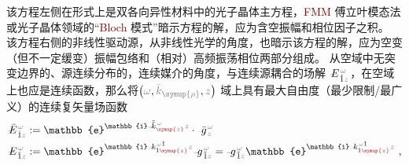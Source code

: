 {\one} 该方程左侧在形式上是双各向异性材料\cite{berryOpticalSingularitiesBianisotropic2005,changWavePropagationBianisotropic2014}中的光子晶体主方程\cite{sakodaOpticalPropertiesPhotonic2005,joannopoulosPhotonicCrystalsMolding2008}，\textcolor{Maroon}{FMM} 傅立叶模态法或光子晶体领域的“\textcolor{Maroon}{Bloch} 模式”暗示方程的解，应为含空振幅和相位因子之积。{\two} 该方程右侧的非线性驱动源，从非线性光学的角度，也暗示该方程的解，应为空变（但不一定缓变）振幅包络和（相对）高频振荡相位两部分组成\cite{boydNonlinearOptics2019}。{\three} 从空域中无突变边界的、源连续分布的，连续媒介的角度，与连续源耦合的场解 $\Xint{\mathcolor{gray}{-}}{25}{E}^{\;\!\mathcolor{gray}{\omega}}_{\;\! \hat{1} \mathcolor{gray}{z}}$，在空域上也应是连续函数，那么将$\left( \mathcolor{gray}{\omega}, \mathcolor{gray}{\bar{k}_{\symup{\rho}}}, \mathcolor{gray}{z} \right)$ 域上具有最大自由度（最少限制/最广义）的连续复矢量场函数
\begin{subequations} \label{eq:trial_solution}
\begin{align}
	\Xint{\mathcolor{gray}{-}}{30}{\bar{E}}^{\;\!\mathcolor{gray}{\omega}}_{\;\! \hat{1} \mathcolor{gray}{z}} &:= \mathbb{e}^{\mathbb{i} \Xint{{}^{}_{\mathcolor{gray}{-}}}{10}{\bar{\bar{k}}}_{\textcolor{Maroon}{\symup{z}}}^{\;\! \mathcolor{gray}{\omega}} \mathcolor{gray}{z}} \cdot \Xint{{}^{}_{\mathcolor{gray}{-}}}{10}{\bar{g}}^{\;\!\mathcolor{gray}{\omega}}_{\;\! \mathcolor{gray}{z}} \label{eq:vec-trial_solution} \\
	\Xint{\mathcolor{gray}{-}}{30}{E}^{\;\!\mathcolor{gray}{\omega}}_{\;\! \hat{1} \mathcolor{gray}{z}} &:= \mathbb{e}^{\mathbb{i} \Xint{{}^{}_{\mathcolor{gray}{-}}}{10}{k}_{\hat{1} \textcolor{Maroon}{\symup{z}}}^{\;\! \mathcolor{gray}{\omega} \tilde{1}} \mathcolor{gray}{z}} \Xint{{}^{}_{\mathcolor{gray}{-}}}{10}{g}^{\;\!\mathcolor{gray}{\omega}}_{\;\! \tilde{1} \mathcolor{gray}{z}} = \Xint{{}^{}_{\mathcolor{gray}{-}}}{10}{g}^{\;\!\mathcolor{gray}{\omega}}_{\;\! \tilde{1} \mathcolor{gray}{z}} \mathbb{e}^{\mathbb{i} \Xint{{}^{}_{\mathcolor{gray}{-}}}{10}{k}_{\hat{1} \textcolor{Maroon}{\symup{z}}}^{\;\! \mathcolor{gray}{\omega} \tilde{1}} \mathcolor{gray}{z}} \label{eq:compo-trial_solution} ~,
\end{align}
\end{subequations}
